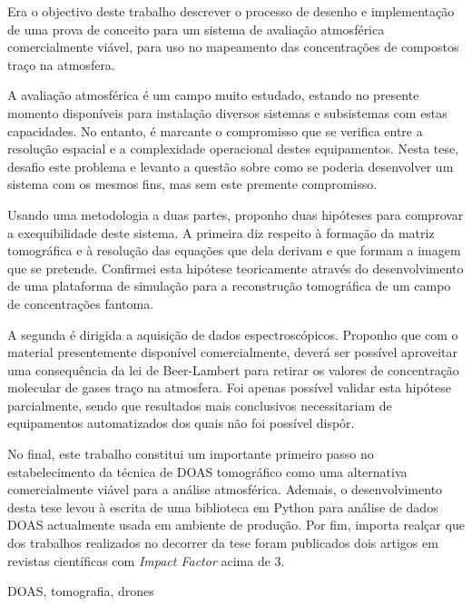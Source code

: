 

Era o objectivo deste trabalho descrever o processo de desenho e
implementação de uma prova de conceito para um sistema de avaliação
atmosférica comercialmente viável, para uso no mapeamento das
concentrações de compostos traço na atmosfera.

A avaliação atmosférica é um campo muito estudado, estando no presente
momento disponíveis para instalação diversos sistemas e subsistemas com
estas capacidades. No entanto, é marcante o compromisso que se verifica
entre a resolução espacial e a complexidade operacional destes
equipamentos. Nesta tese, desafio este problema e levanto a questão
sobre como se poderia desenvolver um sistema com os mesmos fins, mas sem
este premente compromisso. 

Usando uma metodologia a duas partes, proponho duas hipóteses  para
comprovar a exequibilidade deste sistema. A primeira diz respeito à
formação da matriz tomográfica e à resolução das equações que dela
derivam e que formam a imagem que se pretende. Confirmei esta hipótese
teoricamente através do desenvolvimento de uma plataforma de simulação
para a reconstrução tomográfica de um campo de concentrações fantoma.

A segunda é dirigida a aquisição de dados espectroscópicos. Proponho que
com o material presentemente disponível comercialmente, deverá ser
possível aproveitar uma consequência da lei de Beer-Lambert para retirar
os valores de concentração molecular de gases traço na atmosfera. Foi
apenas possível validar esta hipótese parcialmente, sendo que resultados
mais conclusivos necessitariam de equipamentos automatizados dos quais
não foi possível dispôr.

No final, este trabalho constitui um importante primeiro passo no
estabelecimento da técnica de \gls{DOAS} tomográfico como uma
alternativa comercialmente viável para a análise atmosférica. Ademais, o
desenvolvimento desta tese levou à escrita de uma biblioteca em Python
para análise de dados \gls{DOAS} actualmente usada em ambiente de
produção. Por fim, importa realçar que dos trabalhos realizados no
decorrer da tese foram publicados dois artigos em revistas científicas
com \emph{Impact Factor} acima de 3.

\begin{keywords}
    \gls{DOAS}, tomografia, drones
\end{keywords}
